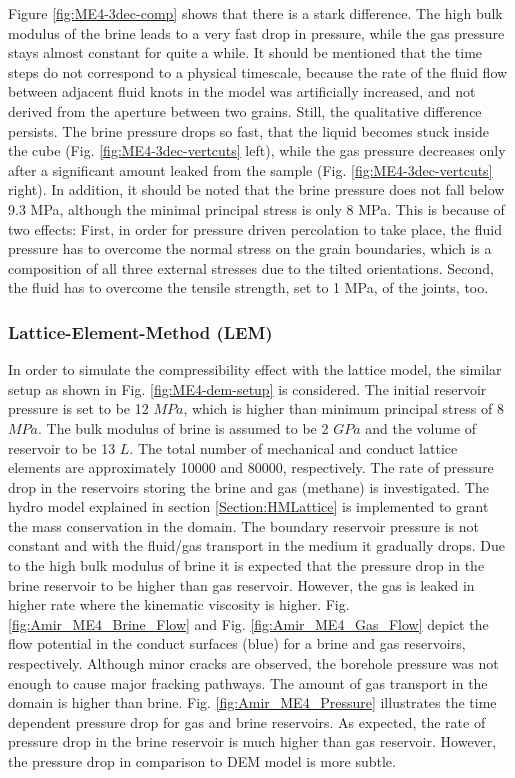 Figure \ref{fig:ME4-3dec-comp} shows that there is a stark difference. The high bulk modulus of the brine leads to a very fast drop in pressure, while the gas pressure stays almost constant for quite a while. It should be mentioned that the time steps do not correspond to a physical timescale, because the rate of the fluid flow between adjacent fluid knots in the model was artificially increased, and not derived from the aperture between two grains. Still, the qualitative difference persists. The brine pressure drops so fast, that the liquid becomes stuck inside the cube (Fig. \ref{fig:ME4-3dec-vertcuts} left), while the gas pressure decreases only after a significant amount leaked from the sample (Fig. \ref{fig:ME4-3dec-vertcuts} right). In addition, it should be noted that the brine pressure does not fall below 9.3 MPa, although the minimal principal stress is only 8 MPa. This is because of two effects: First, in order for pressure driven percolation to take place, the fluid pressure has to overcome the normal stress on the grain boundaries, which is a composition of all three external stresses due to the tilted orientations. Second, the fluid has to overcome the tensile strength, set to 1 MPa, of the joints, too. 

\subsubsection*{Lattice-Element-Method (LEM)}

In order to simulate the compressibility effect with the lattice model, the similar setup as shown in Fig. \ref{fig:ME4-dem-setup} is considered. The initial reservoir pressure is set to be 12 $MPa$, which is higher than minimum principal stress of 8 $MPa$. The bulk modulus of brine is assumed to be 2 $GPa$ and the volume of reservoir to be 13 $L$. The total number of mechanical and conduct lattice elements are approximately 10000 and 80000, respectively. The rate of pressure drop in the reservoirs storing the brine and gas (methane) is investigated. The hydro model explained in section \ref{Section:HMLattice} is implemented to grant the mass conservation in the domain. The boundary reservoir pressure is not constant and with the fluid/gas transport in the medium it gradually drops. Due to the high bulk modulus of brine it is expected that the pressure drop in the brine reservoir to be higher than gas reservoir. However, the gas is leaked in higher rate where the kinematic viscosity is higher. Fig. \ref{fig:Amir_ME4_Brine_Flow} and Fig. \ref{fig:Amir_ME4_Gas_Flow} depict the flow potential in the conduct surfaces (blue) for a brine and gas reservoirs, respectively. Although minor cracks are observed, the borehole pressure was not enough to cause major fracking pathways. The amount of gas transport in the domain is higher than brine. Fig. \ref{fig:Amir_ME4_Pressure} illustrates the time dependent pressure drop for gas and brine reservoirs. As expected, the rate of pressure drop in the brine reservoir is much higher than gas reservoir. However, the pressure drop in comparison to DEM model is more subtle. 

